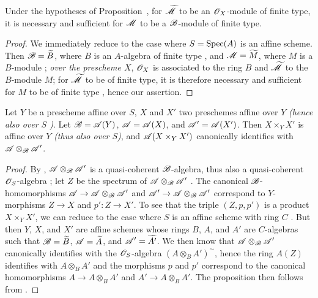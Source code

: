 \begin{corollary}[1.4.5]
\label{II.1.4.5}
Under the hypotheses of Proposition~, for $\widetilde{\mathscr{M}}$ to be an $\mathscr{O}_X$-module of finite type, it is necessary and sufficient for $\mathscr{M}$ to be a $\mathscr{B}$-module of finite type.
\end{corollary}

\begin{proof}
We immediately reduce to the case where $S=\operatorname{Spec}(A)$ is an affine scheme.
Then $\mathscr{B}=\widetilde{B}$, where $B$ is an $A$-algebra of finite type , and $\mathscr{M}=\widetilde{M}$, where $M$ is a $B$-module ; \emph{over the prescheme $X$}, $\mathscr{O}_X$ is associated to the ring $B$ and $\widetilde{\mathscr{M}}$ to the $B$-module $M$; for $\widetilde{\mathscr{M}}$ to be of finite type, it is therefore necessary and sufficient for $M$ to be of finite type , hence our assertion.
\end{proof}

\begin{proposition}[1.4.6]
\label{II.1.4.6}
Let $Y$ be a prescheme affine over $S$, $X$ and $X'$ two preschemes affine over $Y$ \emph{(hence also over $S$ )}.
Let $\mathscr{B}=\mathscr{A}(Y)$, $\mathscr{A}=\mathscr{A}(X)$, and $\mathscr{A}'=\mathscr{A}(X')$.
Then $X\times_Y X'$ is affine over $Y$ \emph{(thus also over $S$)}, and $\mathscr{A}(X\times_Y X')$ canonically identifies with $\mathscr{A}\otimes_\mathscr{B}\mathscr{A}'$.
\end{proposition}

\begin{proof}
By , $\mathscr{A}\otimes_\mathscr{B}\mathscr{A}'$ is a quasi-coherent $\mathscr{B}$-algebra, thus also a quasi-coherent $\mathscr{O}_S$-algebra ; let $Z$ be the spectrum of $\mathscr{A}\otimes_\mathscr{B}\mathscr{A}'$ .
The canonical $\mathscr{B}$-homomorphisms $\sh{A}\to\sh{A}\otimes_\sh{B}\sh{A}'$ and $\sh{A}'\to\sh{A}\otimes_\sh{B}\sh{A}'$ correspond  to $Y$-morphisms $Z\to X$ and $p':Z\to X'$.
To see that the triple $(Z,p,p')$ is a product $X\times_Y X'$, we can reduce to the case where $S$ is an affine scheme with ring $C$ .
But then $Y$, $X$, and $X'$ are affine schemes  whose rings $B$, $A$, and $A'$ are $C$-algebras such that $\mathscr{B}=\widetilde{B}$, $\mathscr{A}=\widetilde{A}$, and $\mathscr{A}'=\widetilde{A'}$.
We then know  that $\mathscr{A}\otimes_\mathscr{B}\mathscr{A}'$ canonically identifies with the $\mathscr{O}_S$-algebra $(A\otimes_B A')^\sim$, hence the ring $A(Z)$ identifies with $A\otimes_B A'$ and the morphisms $p$ and $p'$ correspond to the canonical homomorphisms $A\to A\otimes_B A'$ and $A'\to A\otimes_B A'$.
The proposition then follows from .
\end{proof}

